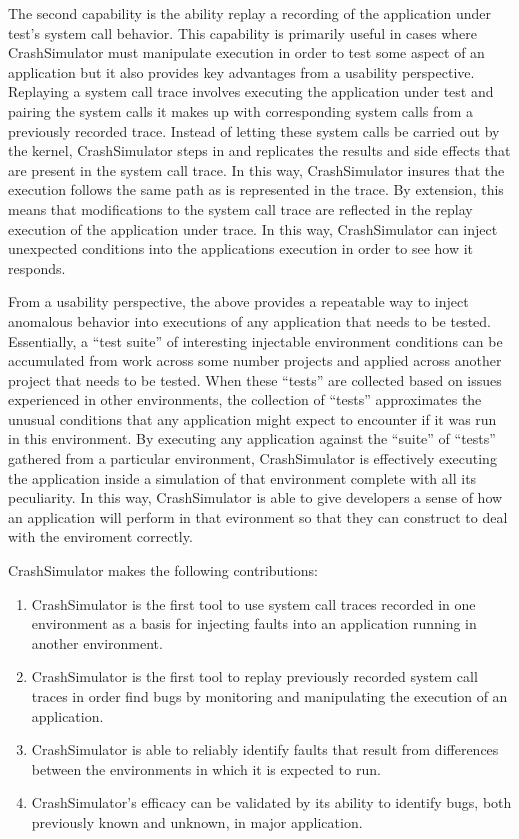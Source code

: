 The second capability is the ability replay a recording of the application under test's system call behavior.  This
capability is primarily useful in cases where CrashSimulator must manipulate execution in order to test some aspect of
an application but it also provides key advantages from a usability perspective.  Replaying a system call trace involves
executing the application under test and pairing the system calls it makes up with corresponding system calls from a
previously recorded trace.  Instead of letting these system calls be carried out by the kernel, CrashSimulator steps in
and replicates the results and side effects that are present in the system call trace.  In this way, CrashSimulator
insures that the execution follows the same path as is represented in the trace.  By extension, this means that
modifications to the system call trace are reflected in the replay execution of the application under trace.  In this
way, CrashSimulator can inject unexpected conditions into the applications execution in order to see how it responds.

From a usability perspective, the above provides a repeatable way to inject anomalous behavior into executions of any
application that needs to be tested.  Essentially, a ``test suite'' of interesting injectable environment conditions can
be accumulated from work across some number projects and applied across another project that needs to be tested.  When
these ``tests'' are collected based on issues experienced in other environments, the collection of ``tests''
approximates the unusual conditions that any application might expect to encounter if it was run in this environment.
By executing any application against the ``suite'' of ``tests'' gathered from a particular environment, CrashSimulator
is effectively executing the application inside a simulation of that environment complete with all its peculiarity.  In
this way, CrashSimulator is able to give developers a sense of how an application will perform in that evironment so
that they can construct to deal with the enviroment correctly.

CrashSimulator makes the following contributions:

    \begin{enumerate}
        \item{CrashSimulator is the first tool to use system call traces recorded in one environment as a basis for
            injecting faults into an application running in another environment.}
        \item{CrashSimulator is the first tool to replay previously recorded system call traces in order find bugs by
            monitoring and manipulating the execution of an application.}
        \item{CrashSimulator is able to reliably identify faults that result from differences between the environments
            in which it is expected to run.}
        \item{CrashSimulator's efficacy can be validated by its ability to identify bugs, both previously known and
            unknown, in major application.}
    \end{enumerate}
